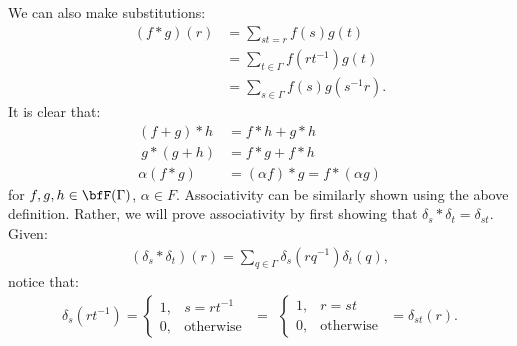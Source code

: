 \begin{example}
        We can also make substitutions:
            \begin{equation*}
            \begin{split}
                (f \ast g)(r)
                & = \sum_{st = r}f(s)g(t) \\
                & = \sum_{t \in \Gamma} f(rt^{-1})g(t) \\
                &  =\sum_{s \in \Gamma}f(s)g(s^{-1}r).
            \end{split}
            \end{equation*}
        It is clear that:
            \begin{equation*}
            \begin{split}
                (f+g)\ast h &= f \ast h + g \ast h \\\
                g \ast (g+h) &= f \ast g + f \ast h \\
                \alpha(f \ast g) &= (\alpha f)\ast g = f \ast (\alpha g)
            \end{split}
            \end{equation*}
        for $f,g,h \in \bfF(\Gamma)$, $\alpha \in F$. Associativity can be similarly shown using the above definition. Rather, we will prove associativity by first showing that $\delta_s \ast \delta_t = \delta_{st}$. Given:
            \begin{equation*}
            \begin{split}
                (\delta_s \ast \delta_t)(r) = \sum_{q \in \Gamma} \delta_s(rq^{-1})\delta_t(q),
            \end{split}
            \end{equation*}
        notice that:
            \begin{equation*}
            \begin{split}
                \delta_s(rt^{-1}) = \begin{cases}
                    1, &s = rt^{-1} \\
                    0, &\text{otherwise}
                \end{cases}
                \hspace{5pt}=\hspace{5pt}
                \begin{cases}
                    1,& r = st \\
                    0 ,& \text{otherwise}
                \end{cases}
                \hspace{5pt} = \delta_{st}(r).

\end{split}
\end{equation*}
\end{example}
